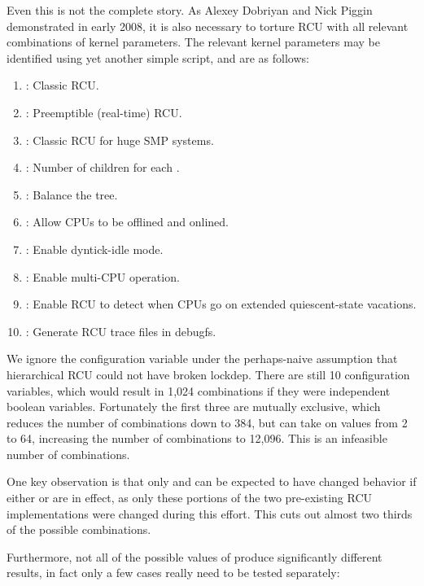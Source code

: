 Even this is not the complete story.
As Alexey Dobriyan and Nick Piggin demonstrated in early 2008, it is
also necessary to torture RCU with all relevant combinations of kernel
parameters.
The relevant kernel parameters may be identified using yet another
simple script, and are as follows:

\begin{enumerate}
\item    {}: Classic RCU.
\item    {}: Preemptible (real-time) RCU.
\item    {}: Classic RCU for huge SMP systems.
\item    {}: Number of children for each
		.
\item    {}: Balance the
		 tree.
\item    {}: Allow CPUs to be offlined
		and onlined.
\item    {}: Enable dyntick-idle mode.
\item    {}: Enable multi-CPU operation.
\item    {}: Enable RCU to detect
		when CPUs go on extended quiescent-state vacations.
\item    {}: Generate RCU trace files in debugfs.
\end{enumerate}

We ignore the  configuration
variable under the perhaps-naive assumption that hierarchical RCU
could not have broken lockdep.
There are still 10 configuration variables, which would result in
1,024 combinations if they were independent boolean variables.
Fortunately the first three are mutually exclusive, which reduces
the number of combinations down to 384, but 
can take on values from 2 to 64, increasing the number of combinations
to 12,096.
This is an infeasible number of combinations.

One key observation is that only 
and  can be expected to have changed behavior
if either  or
 are in effect, as only these portions
of the two pre-existing RCU implementations were changed during this effort.
This cuts out almost two thirds of the possible combinations.

Furthermore, not all of the possible values of
 produce significantly different results,
in fact only a few cases really need to be tested separately:

